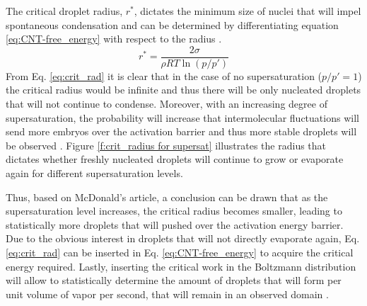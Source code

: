 \documentclass[12pt]{article}
\numberwithin{equation}{section}
\begin{document}
The critical droplet radius, $r^{*}$, dictates the minimum size of nuclei that will impel spontaneous condensation and can be determined by differentiating equation \ref{eq:CNT-free_energy} with respect to the radius \cite{mcdonald1962homogeneous}.
\begin{equation}\label{eq:crit_rad}
    r^{*}=\frac{2\sigma}{\rho RT\ln(p/p')}
\end{equation}
From Eq. \ref{eq:crit_rad} it is clear that in the case of no supersaturation ($p/p'=1$) the critical radius would be infinite and thus there will be only nucleated droplets that will not continue to condense. Moreover, with an increasing degree of supersaturation, the probability will increase that intermolecular fluctuations will send more embryos over the activation barrier and thus more stable droplets will be observed \cite{mcdonald1962homogeneous}. Figure \ref{f:crit_radius for supersat} illustrates the radius that dictates whether freshly nucleated droplets will continue to grow or evaporate again for different supersaturation levels. 

Thus, based on McDonald's article, a conclusion can be drawn that as the supersaturation level increases, the critical radius becomes smaller, leading to statistically more droplets that will pushed over the activation energy barrier. Due to the obvious interest in droplets that will not directly evaporate again, Eq. \ref{eq:crit_rad} can be inserted in Eq. \ref{eq:CNT-free_energy} to acquire the critical energy required. Lastly, inserting the critical work in the Boltzmann distribution will allow to statistically determine the amount of droplets that will form per unit volume of vapor per second, that will remain in an observed domain \cite{mcdonald1962homogeneous}.

\end{document}
